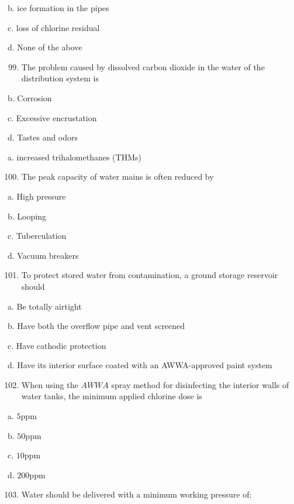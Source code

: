 \documentclass[10pt]{article}
\begin{document}
\begin{enumerate}
\begin{enumerate}
b. ice formation in the pipes

c. loss of chlorine residual

d. None of the above

\begin{enumerate}
  \setcounter{enumi}{98}
  \item The problem caused by dissolved carbon dioxide in the water of the distribution system is
\end{enumerate}

b. Corrosion

c. Excessive encrustation

d. Tastes and odors

a. increased trihalomethanes (THMs)

\begin{enumerate}
  \setcounter{enumi}{99}
  \item The peak capacity of water mains is often reduced by
\end{enumerate}

a. High pressure

b. Looping

c. Tuberculation

d. Vacuum breakers

\begin{enumerate}
  \setcounter{enumi}{100}
  \item To protect stored water from contamination, a ground storage reservoir should
\end{enumerate}

a. Be totally airtight

b. Have both the overflow pipe and vent screened

c. Have cathodic protection

d. Have its interior surface coated with an AWWA-approved paint system

\begin{enumerate}
  \setcounter{enumi}{101}
  \item When using the $A W W A$ spray method for disinfecting the interior walls of water tanks, the minimum applied chlorine dose is
\end{enumerate}

a. $5 \mathrm{ppm}$

b. $50 \mathrm{ppm}$

c. $10 \mathrm{ppm}$

d. $200 \mathrm{ppm}$

\begin{enumerate}
  \setcounter{enumi}{102}
  \item Water should be delivered with a minimum working pressure of:
\end{enumerate}


\end{enumerate}
\end{enumerate}
\end{document}
